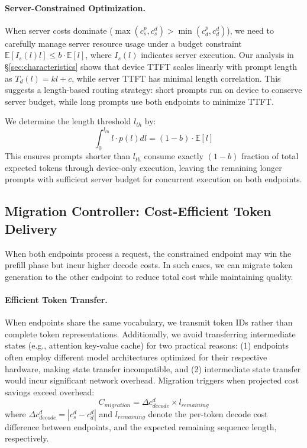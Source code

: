 \paragraph{Server-Constrained Optimization.}
When server costs dominate ($\max(c^p_s, c^d_s) > \min(c^p_d, c^d_d)$), we need to carefully manage server resource usage under a budget constraint $\mathbb{E}[I_s(l)l] \leq b \cdot \mathbb{E}[l]$, where $I_s(l)$ indicates server execution. Our analysis in \S\ref{sec:characteristics} shows that device TTFT scales linearly with prompt length as $T_d(l) = kl + c$, while server TTFT has minimal length correlation. This suggests a length-based routing strategy: short prompts run on device to conserve server budget, while long prompts use both endpoints to minimize TTFT.

We determine the length threshold $l_{th}$ by:
\begin{equation}
  \int_0^{l_{th}} l \cdot p(l) dl = (1-b) \cdot \mathbb{E}[l]
\end{equation}
This ensures prompts shorter than $l_{th}$ consume exactly $(1-b)$ fraction of total expected tokens through device-only execution, leaving the remaining longer prompts with sufficient server budget for concurrent execution on both endpoints.

\subsection{Migration Controller: Cost-Efficient Token Delivery}\label{sec:migration}
When both endpoints process a request, the constrained endpoint may win the prefill phase but incur higher decode costs. In such cases, we can migrate token generation to the other endpoint to reduce total cost while maintaining quality.

\paragraph{Efficient Token Transfer.}

When endpoints share the same vocabulary, we transmit token IDs rather than complete token representations. Additionally, we avoid transferring intermediate states (e.g., attention key-value cache) for two practical reasons: (1) endpoints often employ different model architectures optimized for their respective hardware, making state transfer incompatible, and (2) intermediate state transfer would incur significant network overhead. Migration triggers when projected cost savings exceed overhead:
\begin{equation}
    C_{migration} = \Delta c^d_{decode} \times l_{remaining}
\end{equation}
where $\Delta c^d_{decode} = |c^d_s - c^d_d|$ and $l_{remaining}$ denote the per-token decode cost difference between endpoints, and the expected remaining sequence length, respectively.

